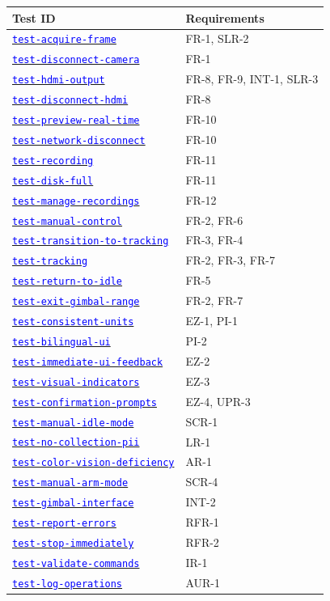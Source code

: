 \documentclass[12pt, titlepage]{article}
\newcommand{\tid}[1]{\hyperlink{tid:#1}{\textcolor{blue}{\texttt{#1}}}}
\begin{document}
\begin{tabularx}{\textwidth}{p{5cm}X}
  \toprule {\bf Test ID}             & {\bf Requirements}       \\
  \midrule
  \tid{test-acquire-frame}           & FR-1, SLR-2              \\
  \tid{test-disconnect-camera}       & FR-1                     \\
  \tid{test-hdmi-output}             & FR-8, FR-9, INT-1, SLR-3 \\
  \tid{test-disconnect-hdmi}         & FR-8                     \\
  \tid{test-preview-real-time}       & FR-10                    \\
  \tid{test-network-disconnect}      & FR-10                    \\
  \tid{test-recording}               & FR-11                    \\
  \tid{test-disk-full}               & FR-11                    \\
  \tid{test-manage-recordings}       & FR-12                    \\
  \tid{test-manual-control}          & FR-2, FR-6               \\
  \tid{test-transition-to-tracking}  & FR-3, FR-4               \\
  \tid{test-tracking}                & FR-2, FR-3, FR-7         \\
  \tid{test-return-to-idle}          & FR-5                     \\
  \tid{test-exit-gimbal-range}       & FR-2, FR-7               \\
  \tid{test-consistent-units}        & EZ-1, PI-1               \\
  \tid{test-bilingual-ui}            & PI-2                     \\
  \tid{test-immediate-ui-feedback}   & EZ-2                     \\
  \tid{test-visual-indicators}       & EZ-3                     \\
  \tid{test-confirmation-prompts}    & EZ-4, UPR-3              \\
  \tid{test-manual-idle-mode}        & SCR-1                    \\
  \tid{test-no-collection-pii}       & LR-1                     \\
  \tid{test-color-vision-deficiency} & AR-1                     \\
  \tid{test-manual-arm-mode}         & SCR-4                    \\
  \tid{test-gimbal-interface}        & INT-2                    \\
  \tid{test-report-errors}           & RFR-1                    \\
  \tid{test-stop-immediately}        & RFR-2                    \\
  \tid{test-validate-commands}       & IR-1                     \\
  \tid{test-log-operations}          & AUR-1                    \\
  \bottomrule
\end{tabularx}
\end{document}
